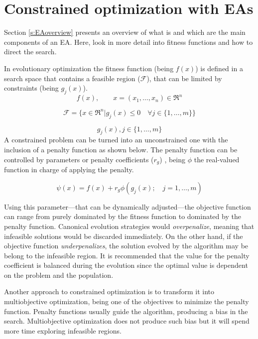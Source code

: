\chapter{Constrained optimization with EAs}\label{ch:EA}

Section \ref{s:EAoverview} presents an overview of what is and which are the main components of an \acs{EA}. Here, look in more detail into fitness functions and how to direct the search.

In evolutionary optimization the fitness function (being $f(x)$) is defined in a search space that contains a feasible region ($\mathcal{F}$), that can be limited by constraints (being $g_j(x)$).
$$ f(x),\qquad x = (x_1,\ldots,x_n)\in \Re^n$$

$$ \mathcal{F} = \{x \in \Re^n | g_j(x) \le 0 \quad \forall j \in \{1,\ldots,m\}\} $$

$$ g_j(x), j \in \{1,\ldots, m\}$$
A constrained problem can be turned into an unconstrained one with the inclusion of a penalty function as shown below. The penalty function can be controlled by parameters or penalty coefficients ($r_g$) \cite{runarsson2000stochastic}, being $\phi$ the real-valued function in charge of applying the penalty. 

$$ \psi(x) = f(x) +r_g\phi(g_j(x); \quad j = 1,\ldots, m )$$

Using this parameter---that can be dynamically adjusted---the objective function can range from purely dominated by the fitness function to dominated by the penalty function. Canonical evolution strategies would \textit{overpenalize}, meaning that infeasible solutions would be discarded immediately. On the other hand, if the objective function \textit{underpenalizes}, the solution evolved by the algorithm may be belong to the infeasible region. It is recommended that the value for the penalty coefficient is balanced during the evolution since the optimal value is dependent on the problem and the population.

Another approach to constrained optimization is to transform it into multiobjective optimization\cite{runarsson2003evolutionary}, being one of the objectives to minimize the penalty function. Penalty functions usually guide the algorithm, producing a bias in the search. Multiobjective optimization does not produce such bias but it will spend more time exploring infeasible regions.



